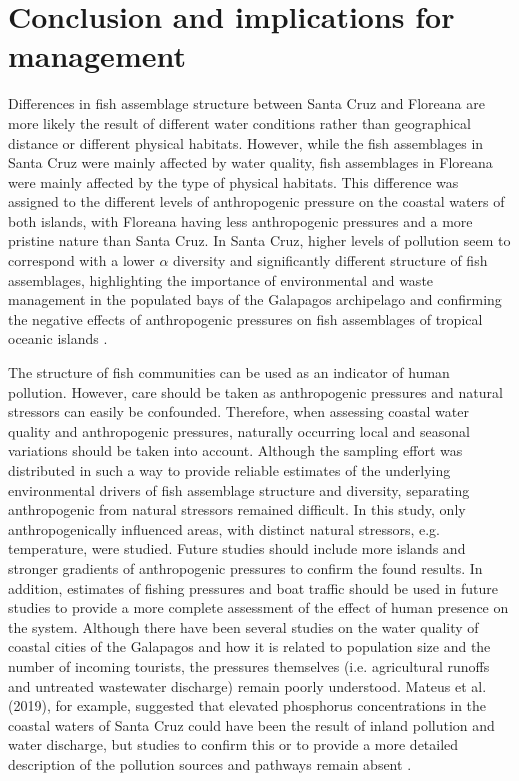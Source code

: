 \section{Conclusion and implications for management}

Differences in fish assemblage structure between Santa Cruz and Floreana are more likely the result of different water conditions rather than geographical distance or different physical habitats. However, while the fish assemblages in Santa Cruz were mainly affected by water quality, fish assemblages in Floreana were mainly affected by the type of physical habitats. This difference was assigned to the different levels of anthropogenic pressure on the coastal waters of both islands, with Floreana having less anthropogenic pressures and a more pristine nature than Santa Cruz. In Santa Cruz, higher levels of pollution seem to correspond with a lower $\alpha$ diversity and significantly different structure of fish assemblages, highlighting the importance of environmental and waste management in the populated bays of the Galapagos archipelago and confirming the negative effects of anthropogenic pressures on fish assemblages of tropical oceanic islands \citep{Quimbayo2019DeterminantsIslands,Sandin2008IslandFish}. 

The structure of fish communities can be used as an indicator of human pollution. However, care should be taken as anthropogenic pressures and natural stressors can easily be confounded. Therefore, when assessing coastal water quality and anthropogenic pressures, naturally occurring local and seasonal variations should be taken into account. Although the sampling effort was distributed in such a way to provide reliable estimates of the underlying environmental drivers of fish assemblage structure and diversity, separating anthropogenic from natural stressors remained difficult. In this study, only anthropogenically influenced areas, with distinct natural stressors, e.g. temperature, were studied. Future studies should include more islands and stronger gradients of anthropogenic pressures to confirm the found results. In addition, estimates of fishing pressures and boat traffic should be used in future studies to provide a more complete assessment of the effect of human presence on the system. Although there have been several studies on the water quality of coastal cities of the Galapagos and how it is related to population size and the number of incoming tourists, the pressures themselves (i.e. agricultural runoffs and untreated wastewater discharge) remain poorly understood. Mateus et al. (2019), for example, suggested that elevated phosphorus concentrations in the coastal waters of Santa Cruz could have been the result of inland pollution and water discharge, but studies to confirm this or to provide a more detailed description of the pollution sources and pathways remain absent \citep{Mateus2019AnArchipelago}.

